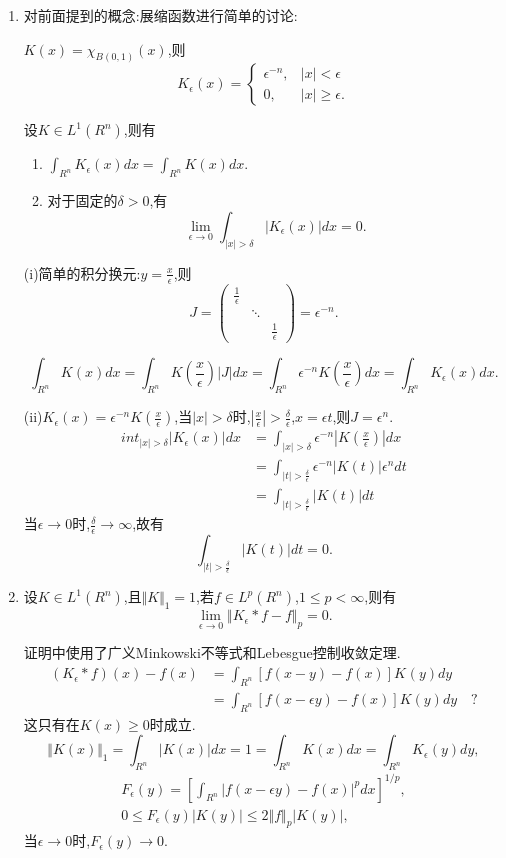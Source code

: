 \documentclass[12pt,a4paper,openany]{book}
\begin{document}
\begin{enumerate}
\item 对前面提到的概念:展缩函数进行简单的讨论:

$K(x)=\chi_{B(0,1)}(x)$,则
\[
K_{\epsilon}(x)=\begin{cases}
\epsilon^{-n}, &|x|<\epsilon\\
0,&|x|\ge \epsilon.
\end{cases}
\]

设$K \in L^1(R^n)$,则有
\begin{enumerate}
\item[(i)]$\int_{R^n}{K_{\epsilon}(x)dx}=\int_{R^n}{K(x)dx}$.
\item[(ii)]对于固定的$\delta>0$,有
\[
\lim_{\epsilon \rightarrow 0}{\int_{|x|>\delta}{|K_{\epsilon}(x)|dx}}=0.
\]
\end{enumerate}

(i)简单的积分换元:$y = \frac{x}{\epsilon}$,则
\[
J=\begin{pmatrix}
\frac{1}{\epsilon} && \\
&\ddots&\\
&&\frac{1}{\epsilon}
\end{pmatrix}=\epsilon^{-n}.
\]

\[
\int_{R^n}{K(x)dx}=\int_{R^n}{K(\frac{x}{\epsilon})|J|dx}=\int_{R^n}{\epsilon^{-n}K(\frac{x}{\epsilon})dx}=\int_{R^n}{K_{\epsilon}(x)dx}.
\]

(ii)$K_{\epsilon}(x)=\epsilon^{-n}K(\frac{x}{\epsilon})$,当$|x|>\delta$时,$|\frac{x}{\epsilon}|>\frac{\delta}{\epsilon}$,$x=\epsilon{}t$,则$J=\epsilon^n$.
\[
\begin{aligned}
int_{|x|>\delta}{|K_{\epsilon}(x)|dx} &= \int_{|x|>\delta}{\epsilon^{-n}|K(\frac{x}{\epsilon})|dx} \\
&=\int_{|t|>\frac{\delta}{\epsilon}}{\epsilon^{-n}|K(t)|\epsilon^ndt}\\
&=\int_{|t|>\frac{\delta}{\epsilon}}{|K(t)|dt}
\end{aligned}
\]
当$\epsilon \rightarrow 0$时,$\frac{\delta}{\epsilon} \rightarrow \infty$,故有
\[
\int_{|t|>\frac{\delta}{\epsilon}}{|K(t)|dt}=0.
\]

\item 设$K \in L^1(R^n)$,且$\Vert{K}\Vert_1=1$,若$f \in L^p(R^n)$,$1 \le p < \infty$,则有
\[
\lim_{\epsilon \rightarrow 0}{\Vert{K_{\epsilon}*f-f}\Vert_p}=0.
\]

证明中使用了广义Minkowski不等式和Lebesgue控制收敛定理.
\[
\begin{aligned}
(K_{\epsilon}*f)(x)-f(x) &= \int_{R^n}{[f(x-y)-f(x)]K_{}(y)dy}\\
&=\int_{R^n}{[f(x-\epsilon{}y)-f(x)]K(y)dy}\quad ?
\end{aligned}
\]
这只有在$K(x)\ge0$时成立.
\[
\Vert{K(x)}\Vert_1=\int_{R^n}{|K(x)|dx}=1=\int_{R^n}{K(x)dx}=\int_{R^n}{K_{\epsilon}(y)dy},
\]
\begin{gather*}
F_{\epsilon}(y)=[\int_{R^n}{|f(x-\epsilon{}y)-f(x)|^pdx}]^{1/p},\\
0 \le F_{\epsilon}(y)|K(y)|\le 2\Vert{f}\Vert_p|K(y)|,
\end{gather*}
当$\epsilon \rightarrow 0$时,$F_{\epsilon}(y) \rightarrow 0$.


\end{enumerate}
\end{document}
